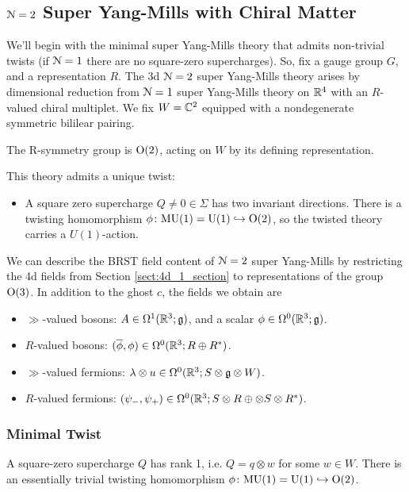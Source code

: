 \documentclass[10pt, oneside]{article}
\newcommand{\MU}{\mathrm{MU}}
\renewcommand{\U}{\mathrm{U}}
\begin{document}
\subsection{\texorpdfstring{$\mathcal N = 2$}{N=2} Super Yang-Mills with Chiral Matter} 
\label{sect:3d_2_section}
We'll begin with the minimal super Yang-Mills theory that admits non-trivial twists (if $\mathcal{N}=1$ there are no square-zero supercharges).  So, fix a gauge group $G$, and a representation $R$.  The 3d $\mathcal{N}=2$ super Yang-Mills theory arises by dimensional reduction from $\mathcal{N}=1$ super Yang-Mills theory on $\mathbb R^4$ with an $R$-valued chiral multiplet.  We fix $W = \mathbb C^2$ equipped with a nondegenerate symmetric bililear pairing.

The R-symmetry group is $\mathrm{O}(2)$, acting on $W$ by its defining representation.  

This theory admits a unique twist:
\begin{itemize}
 \item A square zero supercharge $Q \ne 0 \in \Sigma$ has two invariant directions.  There is a twisting homomorphism $\phi \colon \MU(1) = \U(1)\hookrightarrow \mr O(2)$, so the twisted theory carries a $U(1)$-action.
\end{itemize}

We can describe the BRST field content of $\mathcal{N}=2$ super Yang-Mills by restricting the 4d fields from Section \ref{sect:4d_1_section} to representations of the group $\mathrm{O}(3)$.  In addition to the ghost $c$, the fields we obtain are
\begin{itemize}
 \item $\gg$-valued bosons: $A \in \Omega^1(\mathbb R^3; \mathfrak{g})$, and a scalar $\phi \in \Omega^0(\mathbb R^3; \mathfrak{g})$.
 \item $R$-valued bosons: $(\overline{\phi}, \phi) \in \Omega^0(\mathbb R^3 ; R \oplus R^*)$.
 \item $\gg$-valued fermions: $\lambda \otimes u \in \Omega^0(\mathbb R^3 ; S \otimes \mathfrak{g} \otimes W)$.
 \item $R$-valued fermions: $(\psi_-,\psi_+) \in \Omega^0(\mathbb R^3 ; S \otimes R \oplus \otimes S \otimes R^*)$.
\end{itemize}

\subsubsection{Minimal Twist}
\label{sect:3dminimaltwist}
A square-zero supercharge $Q$ has rank 1, i.e. $Q = q \otimes w$ for some $w \in W$.  There is an essentially trivial twisting homomorphism $\phi \colon \MU(1) = \U(1)\hookrightarrow \mr O(2)$.
\end{document}
